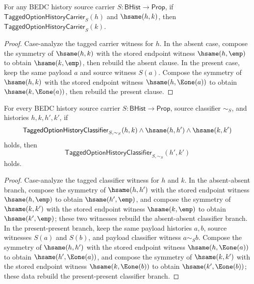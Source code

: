 \begin{theorem}
\label{thm:tagged-option-history-carrier-hsame-transport}
For any BEDC history source carrier $S:\mathsf{BHist}\to\mathsf{Prop}$, if $\mathsf{TaggedOptionHistoryCarrier}_S(h)$ and $\hsame(h,k)$, then $\mathsf{TaggedOptionHistoryCarrier}_S(k)$.
\end{theorem}
\begin{proof}
Case-analyze the tagged carrier witness for $h$. In the absent case, compose the symmetry of $\hsame(h,k)$ with the stored endpoint witness $\hsame(h,\emp)$ to obtain $\hsame(k,\emp)$, then rebuild the absent clause. In the present case, keep the same payload $a$ and source witness $S(a)$. Compose the symmetry of $\hsame(h,k)$ with the stored endpoint witness $\hsame(h,\Eone(a))$ to obtain $\hsame(k,\Eone(a))$, then rebuild the present clause.
\end{proof}

\begin{theorem}
\label{thm:tagged-option-history-classifier-hsame-transport}
For every BEDC history source carrier $S:\mathsf{BHist}\to\mathsf{Prop}$,
source classifier $\sim_S$, and histories $h,k,h',k'$, if
$$
\mathsf{TaggedOptionHistoryClassifier}_{S,\sim_S}(h,k)\land
\hsame(h,h')\land
\hsame(k,k')
$$
holds, then
$$
\mathsf{TaggedOptionHistoryClassifier}_{S,\sim_S}(h',k')
$$
holds.
\end{theorem}
\begin{proof}
Case-analyze the tagged classifier witness for $h$ and $k$. In the absent-absent
branch, compose the symmetry of $\hsame(h,h')$ with the stored endpoint witness
$\hsame(h,\emp)$ to obtain $\hsame(h',\emp)$, and compose the symmetry of
$\hsame(k,k')$ with the stored endpoint witness $\hsame(k,\emp)$ to obtain
$\hsame(k',\emp)$; these two witnesses rebuild the absent-absent classifier
branch. In the present-present branch, keep the same payload histories $a,b$,
source witnesses $S(a)$ and $S(b)$, and payload classifier witness
$a\sim_S b$. Compose the symmetry of $\hsame(h,h')$ with the stored endpoint
witness $\hsame(h,\Eone(a))$ to obtain $\hsame(h',\Eone(a))$, and compose the
symmetry of $\hsame(k,k')$ with the stored endpoint witness
$\hsame(k,\Eone(b))$ to obtain $\hsame(k',\Eone(b))$; these data rebuild the
present-present classifier branch.
\end{proof}

